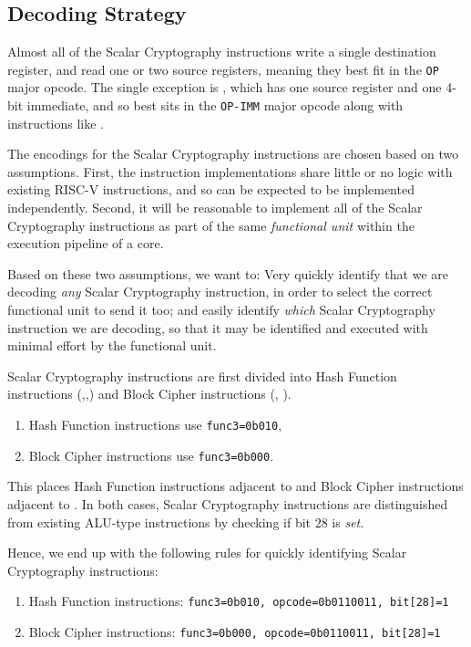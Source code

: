 \subsection{Decoding Strategy}

Almost all of the Scalar Cryptography instructions write a single
destination register, and read one or two source registers, meaning they
best fit in the {\tt OP} major opcode.
The single exception is , which has one source register
and one 4-bit immediate, and so best sits in the {\tt OP-IMM} major opcode
along with instructions like .

The encodings for the Scalar Cryptography instructions are chosen based on
two assumptions.
First, the instruction implementations share little or no logic with existing
RISC-V instructions, and so can be expected to be implemented
independently.
Second, it will be reasonable to implement all of the Scalar Cryptography
instructions as part of the same {\em functional unit} within the
execution pipeline of a core.

Based on these two assumptions, we want to:
Very quickly identify
that we are decoding {\em any} Scalar Cryptography instruction, in order to
select the correct functional unit to send it too; and
easily identify {\em which} Scalar Cryptography instruction we are decoding,
so that it may be identified and executed with minimal effort by the
functional unit.

Scalar Cryptography instructions are first divided into Hash Function
instructions (,,)
and Block Cipher instructions
(, ).
\begin{enumerate}
\item Hash Function instructions use {\tt func3=0b010},
\item Block Cipher instructions  use {\tt func3=0b000}.
\end{enumerate}
This places
Hash Function instructions adjacent to 
and
Block Cipher instructions adjacent to .
In both cases, Scalar Cryptography instructions are distinguished from
existing ALU-type instructions by checking if bit $28$ is {\em set}.

Hence, we end up with the following rules for quickly identifying
Scalar Cryptography instructions:
\begin{enumerate}
\item Hash Function instructions: {\tt func3=0b010, opcode=0b0110011, bit[28]=1}
\item Block Cipher  instructions: {\tt func3=0b000, opcode=0b0110011, bit[28]=1}
\end{enumerate}

